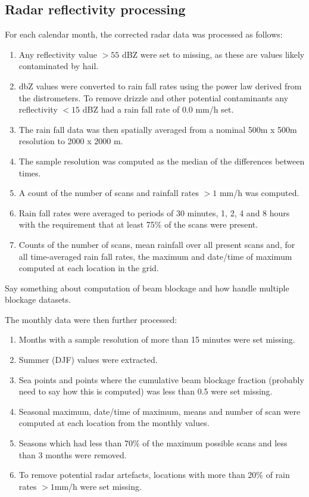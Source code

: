 \documentclass{ametsocV5}
\begin{document}
\subsection{Radar reflectivity processing}
\label{subsect:process}
For each calendar month, the corrected radar data was  processed  as follows: 
\begin{enumerate}
    \item Any reflectivity value $> 55$ dBZ were set to missing, as these are values likely contaminated by hail.
    \item dbZ values were converted to rain fall rates using the power law derived from the distrometers.  To remove drizzle and other potential contaminants  any reflectivity  $< 15 $ dBZ  had a rain fall rate of 0.0 mm/h set. 
    \item The rain fall data was then spatially averaged from a nominal 500m x 500m resolution to 2000 x 2000 m. 
    \item The sample resolution was computed as the median of the differences between times. 
    \item A count of the number of scans and rainfall rates $> 1$ mm/h was computed. 
    \item Rain fall rates were averaged to periods of 30 minutes, 1, 2, 4 and 8 hours with the requirement that at least 75\% of the scans were present. 
    \item Counts of the number of scans, mean rainfall over all present scans and, for all time-averaged rain fall rates, the maximum and date/time of maximum computed at each location in the grid.
\end{enumerate}
Say something about computation of beam blockage and how handle multiple blockage datasets. 

The monthly data were then further processed:
\begin{enumerate}
\item Months with a sample resolution of more than 15 minutes were set missing.  
\item Summer (DJF) values were extracted.
\item Sea points and points where the cumulative beam blockage fraction (probably need to say how this is computed) was less than 0.5 were set missing.  

\item Seasonal maximum, date/time of maximum, means and number of scan were computed at each location from the monthly values.
\item Seasons which had less than 70\% of the maximum possible scans and less than 3 months were removed. 
\item To remove potential radar artefacts, locations with more than 20\% of rain rates  $> 1 $mm/h were set missing. 
\end{enumerate}
\end{document}
